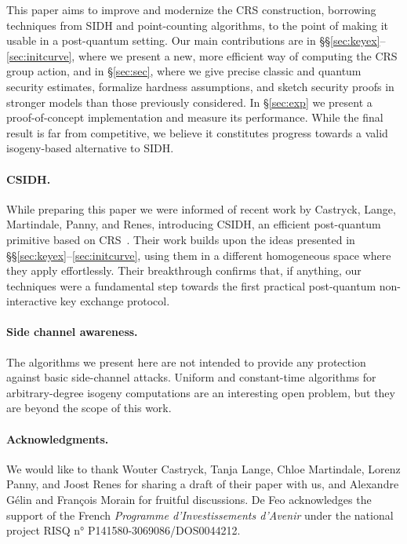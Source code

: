\documentclass{llncs}
\begin{document}
This paper aims to improve and modernize the CRS construction, 
borrowing techniques from SIDH and point-counting algorithms,
to the point of making it usable in a post-quantum setting.  
Our main contributions
are in \S\S\ref{sec:keyex}--\ref{sec:initcurve}, where we present
a new, more efficient way of computing the CRS group action, and in
\S\ref{sec:sec}, where we give precise classic and quantum
security estimates, formalize hardness assumptions, and sketch
security proofs in stronger models than those previously
considered. 
In \S\ref{sec:exp} we present a
proof-of-concept implementation and measure its performance.
While the final result is far from competitive, we believe it
constitutes progress towards a valid isogeny-based
alternative to SIDH.

\paragraph{CSIDH.}
While preparing this paper we were informed of
recent work by Castryck, Lange, Martindale, Panny, and Renes,
introducing CSIDH, 
an efficient post-quantum primitive based on CRS~\cite{csidh}.
Their work builds upon the ideas presented in
\S\S\ref{sec:keyex}--\ref{sec:initcurve}, using them in a
different homogeneous space where they apply effortlessly.  Their
breakthrough confirms that, if anything, our techniques were a
fundamental step towards the first practical post-quantum
non-interactive key exchange protocol.

\paragraph{Side channel awareness.}
The algorithms we present here are not intended to provide any protection
against basic side-channel attacks.  
Uniform and constant-time algorithms for arbitrary-degree isogeny computations
are an interesting open problem,
but they are beyond the scope of this work.

\paragraph{Acknowledgments.}
We would like to thank Wouter Castryck, Tanja Lange, Chloe Martindale,
Lorenz Panny, and Joost Renes for sharing a draft of their paper with
us, and Alexandre Gélin and François Morain for fruitful discussions.
De Feo acknowledges the support of the French \emph{Programme
  d'Investissements d'Avenir} under the national project RISQ n°
P141580-3069086/DOS0044212.
\end{document}
